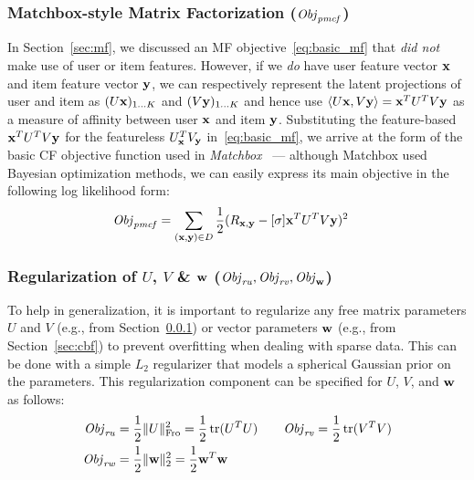 \subsubsection{Matchbox-style Matrix Factorization ($\mathit{Obj}_{\mathit{pmcf}}$)}

\label{sec:matchbox_def}

In Section~\ref{sec:mf}, we discussed an MF objective~\eqref{eq:basic_mf}
that \emph{did not} make use of user or item features.  
However, if we \emph{do} have user feature vector $\mathbf{x}$ 
and item feature vector $\mathbf{y}$, we can respectively
represent the latent projections of user and item as $(U \mathbf{x})_{1 \ldots
K}$ and $(V \mathbf{y})_{1 \ldots K}$ and hence use $\langle U \mathbf{x}, V \mathbf{y} \rangle = \mathbf{x}^T
U^T V \mathbf{y}$ as a measure of affinity between user $\mathbf{x}$ and item $\mathbf{y}$.
Substituting the feature-based $\mathbf{x}^T U^T V \mathbf{y}$ for the featureless 
$U_{\mathbf{x}}^T V_{\mathbf{y}}$ in~\eqref{eq:basic_mf}, we arrive at the form of the basic CF 
objective function used in \emph{Matchbox}~\cite{matchbox} --- although
Matchbox used Bayesian optimization methods, we can easily express
its main objective in the following log likelihood form:
\begin{align}
\mathit{Obj}_{\mathit{pmcf}} & = \sum_{(\mathbf{x},\mathbf{y}) \in D} \frac{1}{2} (R_{\mathbf{x},\mathbf{y}} - [\sigma] \mathbf{x}^T U^T V \mathbf{y})^2 \label{eq:matchbox_obj}
\end{align}

\subsubsection{Regularization of $U$, $V$ \& $\mathbf{w}$ ($\mathit{Obj}_{\mathit{ru}}, \mathit{Obj}_{\mathit{rv}}, \mathit{Obj}_{\mathbf{w}}$)}
%
To help in generalization, it is important to regularize any free
matrix parameters $U$ and $V$ (e.g., from
Section~\ref{sec:matchbox_def}) or vector parameters $\mathbf{w}$ (e.g., from
Section~\ref{sec:cbf}) to prevent overfitting  
when dealing with 
sparse data. This can be done with a simple $L_2$ regularizer that
models a spherical Gaussian prior %
on the parameters.  This
regularization component can be specified for $U$, $V$, and $\mathbf{w}$ 
 as follows:
\begin{align}
\mathit{Obj}_{\mathit{ru}} & = \frac{1}{2} \| U \|_{\mathrm{Fro}}^2 = \frac{1}{2} \operatorname{tr}(U^T U) \qquad
\mathit{Obj}_{\mathit{rv}} = \frac{1}{2} \operatorname{tr}(V^T V) \nonumber \\
\mathit{Obj}_{\mathit{rw}} & = \frac{1}{2} \| \mathbf{w} \|_2^2 = \frac{1}{2} \mathbf{w}^T \mathbf{w} \label{eq:reg}
\end{align}

